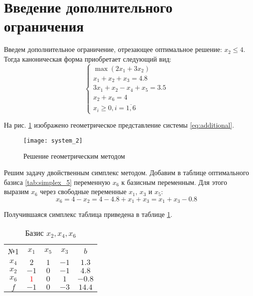 \section{Введение дополнительного ограничения}

Введем дополнительное ограничение, отрезающее оптимальное решение: $x_2 \le 4$. Тогда каноническая форма приобретает следующий вид:
\begin{equation}
\label{eq:additional}
\begin{cases}
	\max \left( 2 x_1 + 3 x_2 \right) \\
	x_1 + x_2 + x_3 = 4.8 \\
	3 x_1 + x_2 - x_4 + x_5 = 3.5 \\
	x_2 + x_6 = 4 \\
	x_i \ge 0, i = \overline{1,6}
\end{cases}
\end{equation}

На рис. \ref{pic:geometric_solution_2} изображено геометрическое представление системы \ref{eq:additional}.

\begin{figure}[H]
\begin{center}
	\texttt{[image: system\_2]}
	\caption{Решение геометрическим методом}
	\label{pic:geometric_solution_2}
\end{center}
\end{figure}

Решим задачу двойственным симплекс методом. Добавим в таблице оптимального базиса 
\ref{tab:simplex_5} переменную $x_6$ к базисным переменным. Для этого выразим $x_6$ через свободные переменные $x_1$, $x_3$ и $x_5$:
\begin{equation*}
x_6 = 4 - x_2 = 4 - 4.8 + x_1 + x_3 = x_1 + x_3 - 0.8
\end{equation*}

Получившаяся симплекс таблица приведена в таблице \ref{tab:add_simplex_1}.

\begin{table}[H]
\begin{center}
	\def\tabcolsep{16pt}
	\def\arraystretch{1.3}
	\caption{Базис $x_2, x_4, x_6$}
	\label{tab:add_simplex_1}
	\begin{tabular}{|c||c|c|c||c|}
		\hline
		№1 & $x_1$ & $x_5$ & $x_3$ & $b$ \\ 
		\hhline{|=#===#=|}
		$x_4$ & $2$ & $1$ & $-1$ & $1.3$ \\ 
		\hline
		$x_2$ & $-1$ & $0$ & $-1$ & $4.8$\\  
		\hline
		$x_6$ & \textcolor{red}{\boldmath$1$} & $0$ & $1$ & $-0.8$\\ 
		\hhline{|=#===#=|}
		$f$ & $-1$ & $0$ & $-3$& $14.4$ \\ 
		\hline
	\end{tabular}
\end{center}
\end{table}


